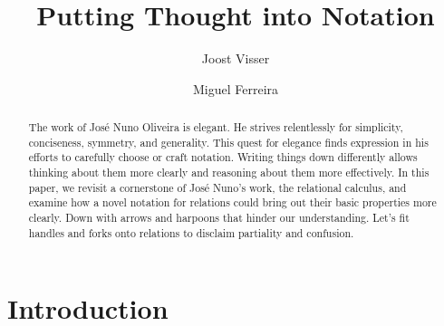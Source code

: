 \documentclass[runningheads,a4paper]{llncs}
\begin{document}


\title{Putting Thought into Notation}


%
\author{Joost Visser \and Miguel Ferreira }


\maketitle

\begin{abstract}
The work of José Nuno Oliveira is elegant. He strives relentlessly for simplicity, conciseness, symmetry, and generality. This quest for elegance finds expression in his efforts to carefully choose or craft notation. Writing things down differently allows thinking about them more clearly and reasoning about them more effectively. In this paper, we revisit a cornerstone of José Nuno’s work, the relational calculus, and examine how a novel notation for relations could bring out their basic properties more clearly. Down with arrows and harpoons that hinder our understanding. Let’s fit handles and forks onto relations to disclaim partiality and confusion.
\end{abstract}


\section{Introduction}\label{sec:intro}
\end{document}
